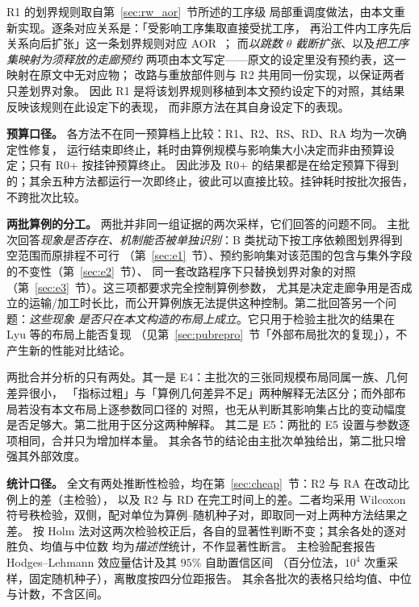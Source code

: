 \documentclass[manuscript,screen,review]{acmart}
\begin{document}
R1 的划界规则取自第~\ref{sec:rw_aor}~节所述的工序级
局部重调度做法，由本文重新实现。逐条对应关系是：「受影响工序集取直接受扰工序，
再沿工件内工序先后关系向后扩张」这一条划界规则对应
AOR~\cite{subramaniam2003maor}；
而\emph{以跳数 \(\theta\) 截断扩张}、以及\emph{把工序集映射为须释放的走廊预约}
两项由本文写定——原文的设定里没有预约表，这一映射在原文中无对应物；
改路与重放部件则与 R2 共用同一份实现，以保证两者只差划界对象。
因此 R1 是将该划界规则移植到本文预约设定下的对照，其结果反映该规则在此设定下的表现，
而非原方法在其自身设定下的表现。

\textbf{预算口径。}
各方法不在同一预算档上比较：R1、R2、RS、RD、RA 均为一次确定性修复，
运行结束即终止，耗时由算例规模与影响集大小决定而非由预算设定；只有 R0+ 按挂钟预算终止。
因此涉及 R0+ 的结果都是在给定预算下得到的；其余五种方法都运行一次即终止，彼此可以直接比较。挂钟耗时按批次报告，不跨批次比较。

\textbf{两批算例的分工。}
两批并非同一组证据的两次采样，它们回答的问题不同。
主批次回答\emph{现象是否存在、机制能否被单独识别}：B 类扰动下按工序依赖图划界得到空范围而原排程不可行
（第~\ref{sec:e1}~节）、预约影响集对该范围的包含与集外字段的不变性（第~\ref{sec:e2}~节）、
同一套改路程序下只替换划界对象的对照（第~\ref{sec:e3}~节）。这三项都要求完全控制算例参数，
尤其是决定走廊争用是否成立的运输/加工时长比，而公开算例族无法提供这种控制。第二批回答另一个问题：\emph{这些现象
是否只在本文构造的布局上成立}。它只用于检验主批次的结果在 Lyu 等的布局上能否复现
（见第~\ref{sec:pubrepro}~节「外部布局批次的复现」），不产生新的性能对比结论。

两批合并分析的只有两处。其一是 E4：主批次的三张同规模布局同属一族、几何差异很小，
「指标过粗」与「算例几何差异不足」两种解释无法区分；而外部布局若没有本文布局上逐参数同口径的
对照，也无从判断其影响集占比的变动幅度是否足够大。第二批用于区分这两种解释。
其二是 E5：两批的 E5 设置与参数逐项相同，合并只为增加样本量。
其余各节的结论由主批次单独给出，第二批只增强其外部效度。

\textbf{统计口径。}
全文有两处推断性检验，均在第~\ref{sec:cheap}~节：R2 与 RA 在改动比例上的差（主检验），
以及 R2 与 RD 在完工时间上的差。二者均采用 Wilcoxon 符号秩检验，双侧，配对单位为算例--随机种子对，即取同一对上两种方法结果之差。
按 Holm 法对这两次检验校正后，各自的显著性判断不变；其余各处的逐对胜负、均值与中位数
均为\emph{描述性}统计，不作显著性断言。
主检验配套报告 Hodges--Lehmann 效应量估计及其 \(95\%\) 自助置信区间
（百分位法，\(10^4\) 次重采样，固定随机种子），离散度按四分位距报告。
其余各批次的表格只给均值、中位与计数，不含区间。
\end{document}

